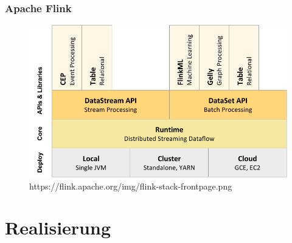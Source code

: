 \documentclass{beamer}
\begin{document}
    \begin{frame}
    		\frametitle{Apache Flink}
            \begin{figure}[H]
                \includegraphics[width=\textwidth]{graphics/flink_stack.png}
                \caption{https://flink.apache.org/img/flink-stack-frontpage.png}
            \end{figure}
    \end{frame}
    \section[Section]{Realisierung}
    
\end{document}

